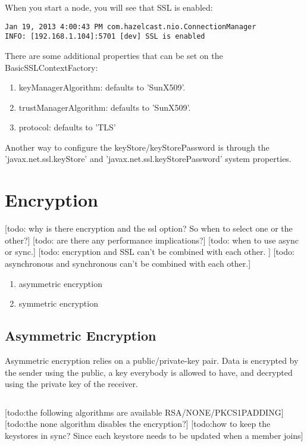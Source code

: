 When you start a node, you will see that SSL is enabled:
\begin{lstlisting}
Jan 19, 2013 4:00:43 PM com.hazelcast.nio.ConnectionManager
INFO: [192.168.1.104]:5701 [dev] SSL is enabled
\end{lstlisting}

There are some additional properties that can be set on the BasicSSLContextFactory:
\begin{enumerate}
\item keyManagerAlgorithm: defaults to 'SunX509'.
\item trustManagerAlgorithm: defaults to 'SunX509'.
\item protocol: defaults to 'TLS'
\end{enumerate}
Another way to configure the keyStore/keyStorePassword is through the 'javax.net.ssl.keyStore' and 'javax.net.ssl.keyStorePassword' system properties.

\section{Encryption}
[todo: why is there encryption and the ssl option? So when to select one or the other?]
[todo: are there any performance implications?]
[todo: when to use async or sync.]
[todo: encryption and SSL can't be combined with each other. ]
[todo: asynchronous and synchronous can't be combined with each other.]

\begin{enumerate}
\item asymmetric encryption
\item symmetric encryption
\end{enumerate}

\subsection{Asymmetric Encryption}
Asymmetric encryption relies on a public/private-key pair. Data is encrypted by the sender using the public, a key everybody is allowed to have, and decrypted using the private key of the receiver. 

\begin{lstlisting}[language=xml]

\end{lstlisting}

[todo:the following algorithms are available RSA/NONE/PKCS1PADDING]
[todo:the none algorithm disables the encryption?]
[todo:how to keep the keystores in sync? Since each keystore needs to be updated when a member joins]

